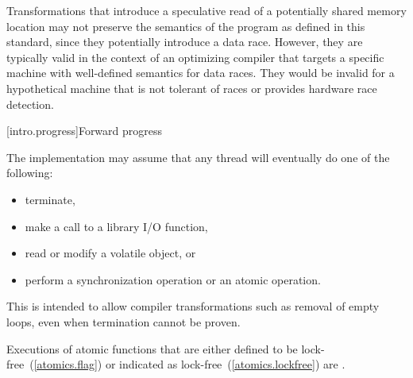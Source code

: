 \pnum
\begin{note} Transformations that introduce a speculative read of a potentially
shared memory location may not preserve the semantics of the \Cpp program as
defined in this standard, since they potentially introduce a data race. However,
they are typically valid in the context of an optimizing compiler that targets a
specific machine with well-defined semantics for data races. They would be
invalid for a hypothetical machine that is not tolerant of races or provides
hardware race detection. \end{note}

[intro.progress]{Forward progress}

\pnum
The implementation may assume that any thread will eventually do one of the 
following:

\begin{itemize}
\item 
terminate,

\item
make a call to a library I/O function,

\item
read or modify a volatile object, or

\item
perform a synchronization operation or an atomic operation.
\end{itemize}

\begin{note} This is intended to allow compiler transformations such as removal of
empty loops, even when termination cannot be proven. \end{note}

\pnum
Executions of atomic functions
that are either defined to be lock-free~(\ref{atomics.flag})
or indicated as lock-free~(\ref{atomics.lockfree})
are .

